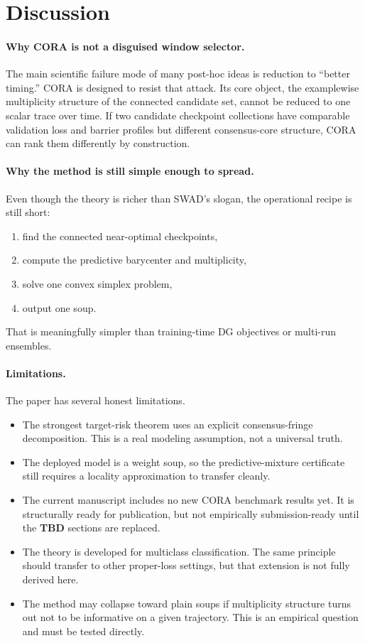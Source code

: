 \documentclass{article}
\newcommand{\TBD}{\textbf{TBD}}
\newcommand{\cora}{\textup{\textsc{CORA}}}
\newcommand{\swad}{\textup{\textsc{SWAD}}}
\begin{document}
\section{Discussion}

\paragraph{Why \cora{} is not a disguised window selector.}
The main scientific failure mode of many post-hoc ideas is reduction to “better timing.” \cora{} is designed to resist that attack. Its core object, the examplewise multiplicity structure of the connected candidate set, cannot be reduced to one scalar trace over time. If two candidate checkpoint collections have comparable validation loss and barrier profiles but different consensus-core structure, \cora{} can rank them differently by construction.

\paragraph{Why the method is still simple enough to spread.}
Even though the theory is richer than \swad{}'s slogan, the operational recipe is still short:
\begin{enumerate}[leftmargin=1.4em]
    \item find the connected near-optimal checkpoints,
    \item compute the predictive barycenter and multiplicity,
    \item solve one convex simplex problem,
    \item output one soup.
\end{enumerate}
That is meaningfully simpler than training-time DG objectives or multi-run ensembles.

\paragraph{Limitations.}
The paper has several honest limitations.
\begin{itemize}[leftmargin=1.4em]
    \item The strongest target-risk theorem uses an explicit consensus-fringe decomposition. This is a real modeling assumption, not a universal truth.
    \item The deployed model is a weight soup, so the predictive-mixture certificate still requires a locality approximation to transfer cleanly.
    \item The current manuscript includes no new \cora{} benchmark results yet. It is structurally ready for publication, but not empirically submission-ready until the \TBD{} sections are replaced.
    \item The theory is developed for multiclass classification. The same principle should transfer to other proper-loss settings, but that extension is not fully derived here.
    \item The method may collapse toward plain soups if multiplicity structure turns out not to be informative on a given trajectory. This is an empirical question and must be tested directly.
\end{itemize}
\end{document}
